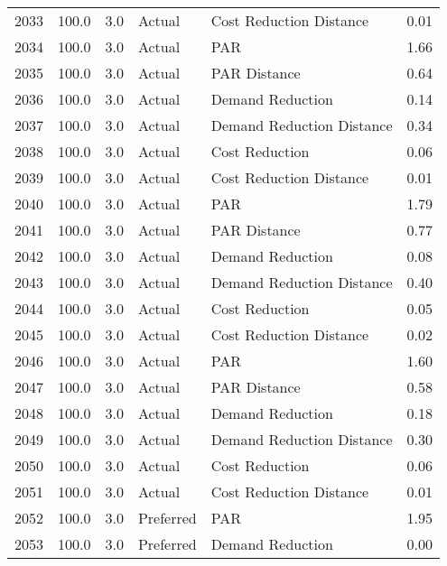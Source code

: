 \begin{longtable}{lrrllr}
2033 &        100.0 &     3.0 &         Actual &    Cost Reduction Distance &   0.01 \\
2034 &        100.0 &     3.0 &         Actual &                        PAR &   1.66 \\
2035 &        100.0 &     3.0 &         Actual &               PAR Distance &   0.64 \\
2036 &        100.0 &     3.0 &         Actual &           Demand Reduction &   0.14 \\
2037 &        100.0 &     3.0 &         Actual &  Demand Reduction Distance &   0.34 \\
2038 &        100.0 &     3.0 &         Actual &             Cost Reduction &   0.06 \\
2039 &        100.0 &     3.0 &         Actual &    Cost Reduction Distance &   0.01 \\
2040 &        100.0 &     3.0 &         Actual &                        PAR &   1.79 \\
2041 &        100.0 &     3.0 &         Actual &               PAR Distance &   0.77 \\
2042 &        100.0 &     3.0 &         Actual &           Demand Reduction &   0.08 \\
2043 &        100.0 &     3.0 &         Actual &  Demand Reduction Distance &   0.40 \\
2044 &        100.0 &     3.0 &         Actual &             Cost Reduction &   0.05 \\
2045 &        100.0 &     3.0 &         Actual &    Cost Reduction Distance &   0.02 \\
2046 &        100.0 &     3.0 &         Actual &                        PAR &   1.60 \\
2047 &        100.0 &     3.0 &         Actual &               PAR Distance &   0.58 \\
2048 &        100.0 &     3.0 &         Actual &           Demand Reduction &   0.18 \\
2049 &        100.0 &     3.0 &         Actual &  Demand Reduction Distance &   0.30 \\
2050 &        100.0 &     3.0 &         Actual &             Cost Reduction &   0.06 \\
2051 &        100.0 &     3.0 &         Actual &    Cost Reduction Distance &   0.01 \\
2052 &        100.0 &     3.0 &      Preferred &                        PAR &   1.95 \\
2053 &        100.0 &     3.0 &      Preferred &           Demand Reduction &   0.00 \\

\end{longtable}
